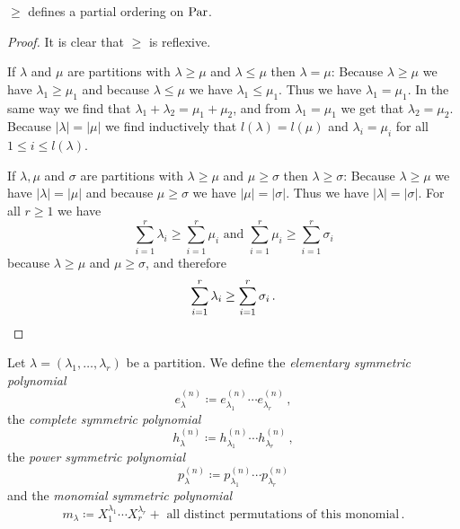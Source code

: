 \begin{lemma}
  $\geq$ defines a partial ordering on $\operatorname{Par}$.
\end{lemma}
\begin{proof}
  It is clear that $\geq$ is reflexive.
  
  If $\lambda$ and $\mu$ are partitions with $\lambda \geq \mu$ and $\lambda \leq \mu$ then $\lambda = \mu$:
  Because $\lambda \geq \mu$ we have $\lambda_1 \geq \mu_1$ and because $\lambda \leq \mu$ we have $\lambda_1 \leq \mu_1$.
  Thus we have $\lambda_1 = \mu_1$.
  In the same way we find that $\lambda_1 + \lambda_2 = \mu_1 + \mu_2$, and from $\lambda_1 = \mu_1$ we get that $\lambda_2 = \mu_2$.
  Because $|\lambda| = |\mu|$ we find inductively that $l(\lambda) = l(\mu)$ and $\lambda_i = \mu_i$ for all $1 \leq i \leq l(\lambda)$.
  
  If $\lambda, \mu$ and $\sigma$ are partitions with $\lambda \geq \mu$ and $\mu \geq \sigma$ then $\lambda \geq \sigma$:
  Because $\lambda \geq \mu$ we have $|\lambda| = |\mu|$ and because $\mu \geq \sigma$ we have $|\mu| = |\sigma|$.
  Thus we have $|\lambda| = |\sigma|$.
  For all $r \geq 1$ we have
  \[
          \sum_{i=1}^r \lambda_i
    \geq  \sum_{i=1}^r \mu_i
    \text{ and }
          \sum_{i=1}^r \mu_i
    \geq  \sum_{i=1}^r \sigma_i
  \]
  because $\lambda \geq \mu$ and $\mu \geq \sigma$, and therefore
  \[
          \sum_{i=1}^r \lambda_i
    \geq  \sum_{i=1}^r \sigma_i \,.
    \qedhere
  \]
\end{proof}


\begin{definition}
  Let $\lambda = (\lambda_1, \dotsc, \lambda_r)$ be a partition. We define the \emph{elementary symmetric polynomial}
  \[
              e^{(n)}_\lambda
    \coloneqq e^{(n)}_{\lambda_1} \dotsm e^{(n)}_{\lambda_r} \,,
  \]
  the \emph{complete symmetric polynomial}
  \[
              h^{(n)}_\lambda
    \coloneqq h^{(n)}_{\lambda_1} \dotsm h^{(n)}_{\lambda_r} \,,
  \]
  the \emph{power symmetric polynomial}
  \[
              p^{(n)}_\lambda
    \coloneqq p^{(n)}_{\lambda_1} \dotsm p^{(n)}_{\lambda_r}
  \]
  and the \emph{monomial symmetric polynomial}
  \[
              m_\lambda
    \coloneqq   X_1^{\lambda_1} \dotsm X_r^{\lambda_r}
              + \text{ all distinct permutations of this monomial} \,.
  \]
\end{definition}


